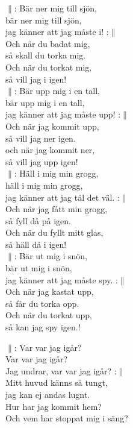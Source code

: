 \documentclass[a6paper, 10pt, twoside]{article}
\begin{document}
\begin{center}
\end{center}
\begin{lyrics}
$\|$: Bär ner mig till sjön, \\
bär ner mig till sjön, \\
jag känner att jag måste i! :$\|$ \\
Och när du badat mig, \\
så skall du torka mig. \\
Och när du torkat mig, \\
så vill jag i igen! 
\vspace{5pt}\\
$\|$: Bär upp mig i en tall,\\
bär upp mig i en tall,\\
jag känner att jag måste upp! :$\|$ \\
Och när jag kommit upp,\\
så vill jag ner igen. \\
och när jag kommit ner,\\
så vill jag upp igen! 
\vspace{5pt}\\
$\|$: Häll i mig min grogg,\\
häll i mig min grogg,\\
jag känner att jag tål det väl. :$\|$\\
Och när jag fått min grogg, \\
så fyll då på igen. \\
Och när du fyllt mitt glas, \\
så häll då i igen! 
\vspace{5pt}\\
$\|$: Bär ut mig i snön, \\
bär ut mig i snön, \\
jag känner att jag måste spy. :$\|$ \\
Och när jag kastat upp, \\
så får du torka opp. \\
Och när du torkat upp, \\
så kan jag spy igen.!

\newpage
\noindent
$\|$: Var var jag igår? \\
Var var jag igår? \\
Jag undrar, var var jag igår? :$\|$\\
Mitt huvud känns så tungt, \\
jag kan ej andas lugnt. \\
Hur har jag kommit hem? \\
Och vem har stoppat mig i säng? 
\end{lyrics}
\end{document}
